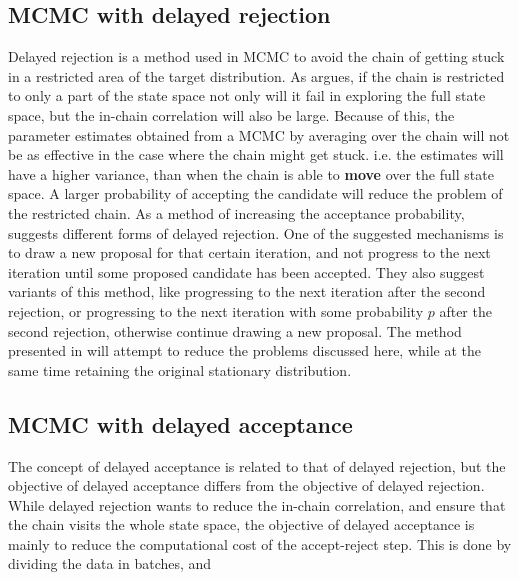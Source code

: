 \subsection{MCMC with delayed rejection}
Delayed rejection is a method used in MCMC to avoid the chain of getting stuck in a restricted area of the target distribution. As \cite{mira2001metropolis} argues, if the chain is restricted to only a part of the state space not only will it fail in exploring the full state space, but the in-chain correlation will also be large. 
Because of this, the parameter estimates obtained from a MCMC by averaging over the chain will not be as effective in the case where the chain might get stuck.  i.e. the estimates will have a higher variance, than when the chain is able to \textbf{move} over the full state space.
A larger probability of accepting the candidate will reduce the problem of the restricted chain. 
As a method of increasing the acceptance probability, \cite{mira2001metropolis} suggests different forms of delayed rejection. One of the suggested mechanisms is to draw a new proposal for that certain iteration, and not progress to the next iteration until some proposed candidate has been accepted. 
They also suggest variants of this method, like progressing to the next iteration after the second rejection, or progressing to the next iteration with some probability $p$ after the second rejection, otherwise continue drawing a new proposal. 
The method presented in \cite{mira2001metropolis} will attempt to reduce the problems discussed here, while at the same time retaining the original stationary distribution.

\subsection{MCMC with delayed acceptance}
The concept of delayed acceptance is related to that of delayed rejection, but the objective of delayed acceptance differs from the objective of delayed rejection. While delayed rejection wants to reduce the in-chain correlation, and ensure that the chain visits the whole state space, the objective of delayed acceptance is mainly to reduce the computational cost of the accept-reject step.  
This is done by dividing the data in batches, and  
